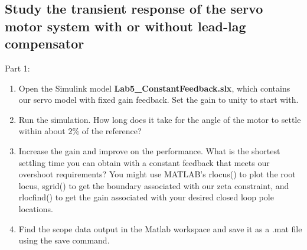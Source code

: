 \documentclass[11pt,a4paper]{article}
\begin{document}


\subsection{Study the transient response of the servo motor system with or without lead-lag compensator} \label{ss:transient}
Part 1:
\begin{enumerate}
\item Open the Simulink model \textbf{Lab5\_ConstantFeedback.slx}, which contains our servo model with fixed gain feedback. Set the gain to unity to start with.
\item Run the simulation. How long does it take for the angle of the motor to settle within about 2\% of the reference?
\item Increase the gain and improve on the performance. What is the shortest settling time you can obtain with a constant feedback that meets our overshoot requirements? You might use MATLAB's rlocus() to plot the root locus, sgrid() to get the boundary associated with our zeta constraint, and rlocfind() to get the gain associated with your desired closed loop pole locations.
\item Find the scope data output in the Matlab workspace and save it as a .mat file using the save command.
\end{enumerate}
\end{document}
